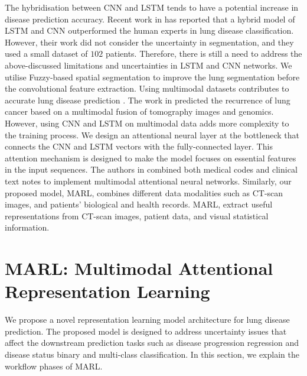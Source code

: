\documentclass[conference]{IEEEtran}
\begin{document}
The hybridisation between CNN and LSTM tends to have a potential increase in disease prediction accuracy. Recent work in \cite{marentakis2021lung} has reported that a hybrid model of LSTM and CNN outperformed the human experts in lung disease classification. However, their work did not consider the uncertainty in segmentation, and they used a small dataset of $102$ patients. Therefore, there is still a need to address the above-discussed limitations and uncertainties in LSTM and CNN networks. We utilise Fuzzy-based spatial segmentation to improve the lung segmentation before the convolutional feature extraction. Using multimodal datasets contributes to accurate lung disease prediction \cite{tang2020elaboration,li2020deep}. The work in \cite{subramanian2020multimodal} predicted the recurrence of lung cancer based on a multimodal fusion of tomography images and genomics. However, using CNN and LSTM on multimodal data adds more complexity to the training process. We design an attentional neural layer at the bottleneck that connects the CNN and LSTM vectors with the fully-connected layer. This attention mechanism is designed to make the model focuses on essential features in the input sequences. The authors in \cite{qiao2019mnn} combined both medical codes and clinical text notes to implement multimodal attentional neural networks. Similarly, our proposed model, MARL, combines different data modalities such as CT-scan images, and patients' biological and health records. MARL, extract useful representations from CT-scan images, patient data, and visual statistical information. 


\section{MARL: Multimodal Attentional Representation Learning}\label{rm}
We propose a novel representation learning model architecture for lung disease prediction. The proposed model is designed to address uncertainty issues that affect the downstream prediction tasks such as disease progression regression and disease status binary and multi-class classification. In this section, we explain the workflow phases of MARL.
\end{document}
